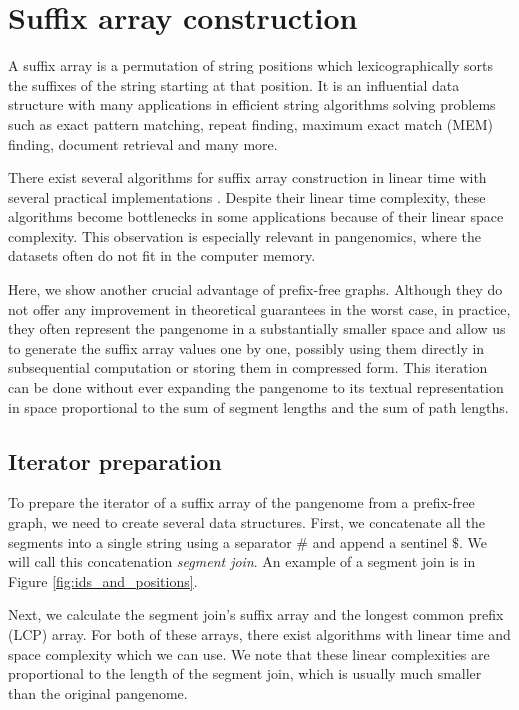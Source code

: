 \section{Suffix array construction}
A suffix array is a permutation of string positions which lexicographically
sorts the suffixes of the string starting at that position.
It is an influential data structure with many applications in efficient string algorithms solving problems such as exact pattern matching, repeat finding, maximum exact match (MEM) finding, document retrieval and many more.

There exist several algorithms for suffix array construction in linear time \cite{skew2003karkkainen,sais2009nong,saoverview2007puglisi} with several practical implementations \cite{louza2017inducing,libdivsufsort}.
Despite their linear time complexity, these algorithms become bottlenecks in some applications because of their linear space complexity.
This observation is especially relevant in pangenomics, where the datasets often do not fit in the computer memory.

Here, we show another crucial advantage of prefix-free graphs.
Although they do not offer any improvement in theoretical guarantees in the worst case, in practice, they often represent the pangenome in a substantially smaller space and allow us to generate the suffix array values one by one, possibly using them directly in subsequential computation or storing them in compressed form.
This iteration can be done without ever expanding the pangenome to its textual representation in space proportional to the sum of segment lengths and the sum of path lengths.

\subsection{Iterator preparation}
To prepare the iterator of a suffix array of the pangenome from a prefix-free graph, we need to create several data structures.
First, we concatenate all the segments into a single string using a separator $\#$ and append a sentinel $\$$.
We will call this concatenation \emph{segment join}.
An example of a segment join is in Figure \ref{fig:ids_and_positions}.

Next, we calculate the segment join's suffix array and the longest common prefix (LCP) array.
For both of these arrays, there exist algorithms with linear time and space complexity which we can use.
We note that these linear complexities are proportional to the length of the segment join, which is usually much smaller than the original pangenome.

